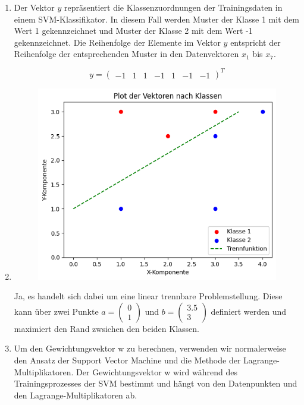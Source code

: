 \documentclass[a4paper,12pt]{article}
\begin{document}
\begin{enumerate}

	\item Der Vektor $y$ repräsentiert die Klassenzuordnungen der Trainingsdaten in einem SVM-Klassifikator. 
		In diesem Fall werden Muster der Klasse 1 mit dem Wert 1 gekennzeichnet und Muster der Klasse 2 mit dem Wert -1 gekennzeichnet. 
		Die Reihenfolge der Elemente im Vektor $y$ entspricht der Reihenfolge der entsprechenden Muster in den Datenvektoren $x_1$ bis $x_7$.
		
		\[ y= \begin{pmatrix} -1 & 1 & 1 & -1 & 1 & -1 & -1 \end{pmatrix}^T \]
	
	
	\item
		\begin{figure}[H]
			\centering
			\includegraphics[width = .7\linewidth]{aufgabe-3-2.png}
	  	\end{figure}

		Ja, es handelt sich dabei um eine linear trennbare Problemstellung. Diese kann über zwei Punkte 
		$a=\begin{pmatrix} 0 \\ 1 \end{pmatrix}$ und $b=\begin{pmatrix} 3.5 \\ 3 \end{pmatrix}$ definiert werden 
		und maximiert den Rand zwsichen den beiden Klassen.  
	

	\item 
	
	Um den Gewichtungsvektor w zu berechnen, verwenden wir normalerweise den Ansatz der Support Vector Machine und die Methode der Lagrange-Multiplikatoren. 
	Der Gewichtungsvektor w wird während des Trainingsprozesses der SVM bestimmt und hängt von den Datenpunkten und den Lagrange-Multiplikatoren ab.


\end{enumerate}
\end{document}
